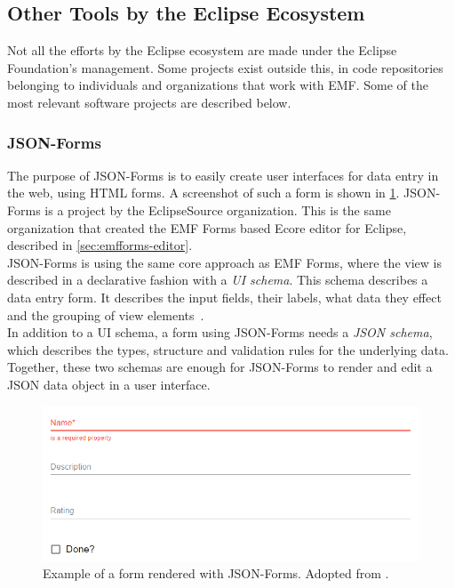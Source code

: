 \subsection{Other Tools by the Eclipse Ecosystem}
Not all the efforts by the Eclipse ecosystem are made under the Eclipse Foundation's management.
Some projects exist outside this, in code repositories belonging to individuals and organizations that work with \acrshort{EMF}.
Some of the most relevant software projects are described below.

\subsubsection{JSON-Forms}\label{sec:json-forms}

The purpose of JSON-Forms is to easily create user interfaces for data entry in the web, using HTML forms.
A screenshot of such a form is shown in \cref{fig:json-forms-example}.
JSON-Forms is a project by the EclipseSource organization.
This is the same organization that created the EMF Forms based \gls{Ecore} editor for \gls{Eclipse}, described in \cref{sec:emfforms-editor}.\\

JSON-Forms is using the same core approach as EMF Forms, where the view is described in a declarative fashion with a \textit{UI schema}.
This schema describes a data entry form.
It describes the input fields, their labels, what data they effect and the grouping of view elements~\cite{eclipsesourceWhatJSONForms}.\\

In addition to a UI schema, a form using JSON-Forms needs a \textit{JSON schema}, which describes the types, structure and validation rules for the underlying data.
Together, these two schemas are enough for JSON-Forms to render and edit a \gls{JSON} data object in a user interface.

\begin{figure}[htbp]  %
  \centering
  \includegraphics[width=\textwidth]{figures/pre-project/json-forms-example.png}
  \caption[JSON-Forms Example]{Example of a form rendered with JSON-Forms. Adopted from \cite{eclipsesourceWhatJSONForms}.}\label{fig:json-forms-example}
\end{figure}

